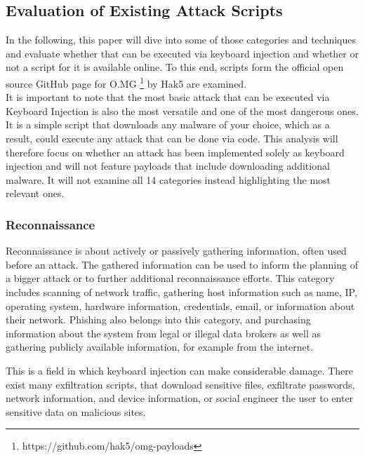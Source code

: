 \subsection{Evaluation of Existing Attack Scripts}

In the following, this paper will dive into some of those categories and techniques and evaluate whether that can be executed via keyboard injection and whether or not a script for it is available online. To this end, scripts form the official open source GitHub page for O.MG \footnote{https://github.com/hak5/omg-payloads} by Hak5 are examined. \\
It is important to note that the most basic attack that can be executed via Keyboard Injection is also the most versatile and one of the most dangerous ones. It is a simple script that downloads any malware of your choice, which as a result, could execute any attack that can be done via code.  
This analysis will therefore focus on whether an attack has been implemented solely as keyboard injection and will not feature payloads that include downloading additional malware. It will not examine all 14 categories instead highlighting the most relevant ones. 

\subsubsection{Reconnaissance}

Reconnaissance is about actively or passively gathering information, often used before an attack. The gathered information can be used to inform the planning of a bigger attack or to further additional reconnaissance efforts. This category includes scanning of network traffic, gathering host information such as name, IP, operating system, hardware information, credentials, email, or information about their network. Phishing also belongs into this category, and purchasing information about the system from legal or illegal data brokers as well as gathering publicly available information, for example from the internet. \cite{MITREATTCK}

This is a field in which keyboard injection can make considerable damage. There exist many exfiltration scripts, that download sensitive files, exfiltrate passwords, network information, and device information, or social engineer the user to enter sensitive data on malicious sites. 

